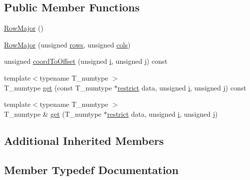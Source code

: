 \subsection*{Public Member Functions}
\begin{DoxyCompactItemize}
\item 
\hyperlink{classRowMajor_ab7b36460eddb20cadb1032f5e967634e}{Row\+Major} ()
\item 
\hyperlink{classRowMajor_af17428a09d00116660012d37f81a8f84}{Row\+Major} (unsigned \hyperlink{classAsymmetricMatrix_adf8ff298b6b24882a147fdcedebe1bbd}{rows}, unsigned \hyperlink{classAsymmetricMatrix_a5ef0ec381e4d33a1f19be7c3e26410d4}{cols})
\item 
unsigned \hyperlink{classRowMajor_a304ac9f90e2ba8be95875a2f55cb0364}{coord\+To\+Offset} (unsigned \hyperlink{indexexpr_8h_aabd77643995707c185e95c8cb2782c81}{i}, unsigned \hyperlink{indexexpr_8h_aa1f3325d66516548e69238097857fa98}{j}) const 
\item 
{\footnotesize template$<$typename T\+\_\+numtype $>$ }\\T\+\_\+numtype \hyperlink{classRowMajor_a79b8d5bf99f2d695e23064c8461cc417}{get} (const T\+\_\+numtype $\ast$\hyperlink{compiler_8h_a080abdcb9c02438f1cd2bb707af25af8}{restrict} data, unsigned \hyperlink{indexexpr_8h_aabd77643995707c185e95c8cb2782c81}{i}, unsigned \hyperlink{indexexpr_8h_aa1f3325d66516548e69238097857fa98}{j}) const 
\item 
{\footnotesize template$<$typename T\+\_\+numtype $>$ }\\T\+\_\+numtype \& \hyperlink{classRowMajor_ae92b68148ec0c98b7626c354d6b92bd5}{get} (T\+\_\+numtype $\ast$\hyperlink{compiler_8h_a080abdcb9c02438f1cd2bb707af25af8}{restrict} data, unsigned \hyperlink{indexexpr_8h_aabd77643995707c185e95c8cb2782c81}{i}, unsigned \hyperlink{indexexpr_8h_aa1f3325d66516548e69238097857fa98}{j})
\end{DoxyCompactItemize}
\subsection*{Additional Inherited Members}


\subsection{Member Typedef Documentation}
\hypertarget{classRowMajor_ab2fbe61409740e91b674de66e515b05f}{}
